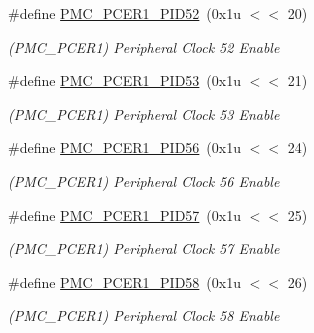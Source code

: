 \begin{DoxyCompactItemize}
\mbox{\label{group__SAMV71__PMC_gaeb901f7df5ece868c18ca3639243d086}} 
\#define \mbox{\hyperlink{group__SAMV71__PMC_gaeb901f7df5ece868c18ca3639243d086}{P\+M\+C\+\_\+\+P\+C\+E\+R1\+\_\+\+P\+I\+D52}}~(0x1u $<$$<$ 20)
\begin{DoxyCompactList}\small\item\em (P\+M\+C\+\_\+\+P\+C\+E\+R1) Peripheral Clock 52 Enable \end{DoxyCompactList}\item 
\mbox{\label{group__SAMV71__PMC_ga8b8a346dd4009ecfef9c1575ecffd890}} 
\#define \mbox{\hyperlink{group__SAMV71__PMC_ga8b8a346dd4009ecfef9c1575ecffd890}{P\+M\+C\+\_\+\+P\+C\+E\+R1\+\_\+\+P\+I\+D53}}~(0x1u $<$$<$ 21)
\begin{DoxyCompactList}\small\item\em (P\+M\+C\+\_\+\+P\+C\+E\+R1) Peripheral Clock 53 Enable \end{DoxyCompactList}\item 
\mbox{\label{group__SAMV71__PMC_ga30b2500985269dae733e4d36b1e725cb}} 
\#define \mbox{\hyperlink{group__SAMV71__PMC_ga30b2500985269dae733e4d36b1e725cb}{P\+M\+C\+\_\+\+P\+C\+E\+R1\+\_\+\+P\+I\+D56}}~(0x1u $<$$<$ 24)
\begin{DoxyCompactList}\small\item\em (P\+M\+C\+\_\+\+P\+C\+E\+R1) Peripheral Clock 56 Enable \end{DoxyCompactList}\item 
\mbox{\label{group__SAMV71__PMC_ga745b950a0d2ffe63529fc9c9ebed2ac6}} 
\#define \mbox{\hyperlink{group__SAMV71__PMC_ga745b950a0d2ffe63529fc9c9ebed2ac6}{P\+M\+C\+\_\+\+P\+C\+E\+R1\+\_\+\+P\+I\+D57}}~(0x1u $<$$<$ 25)
\begin{DoxyCompactList}\small\item\em (P\+M\+C\+\_\+\+P\+C\+E\+R1) Peripheral Clock 57 Enable \end{DoxyCompactList}\item 
\mbox{\label{group__SAMV71__PMC_ga59642f0dc0deae066913275e09f98978}} 
\#define \mbox{\hyperlink{group__SAMV71__PMC_ga59642f0dc0deae066913275e09f98978}{P\+M\+C\+\_\+\+P\+C\+E\+R1\+\_\+\+P\+I\+D58}}~(0x1u $<$$<$ 26)
\begin{DoxyCompactList}\small\item\em (P\+M\+C\+\_\+\+P\+C\+E\+R1) Peripheral Clock 58 Enable \end{DoxyCompactList}\item 
$$
\end{DoxyCompactItemize}
